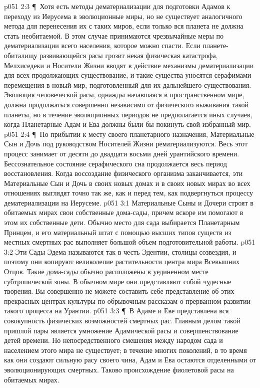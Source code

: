 \vs p051 2:3 \P\ Хотя есть методы дематериализации для подготовки Адамов к переходу из Иерусема в эволюционные миры, но не существует аналогичного метода для перенесения их с таких миров, если только вся планета не должна стать необитаемой. В этом случае принимаются чрезвычайные меры по дематериализации всего населения, которое можно спасти. Если планете\hyp{}обиталищу развивающейся расы грозит некая физическая катастрофа, Мелхиседеки и Носители Жизни вводят в действие механизмы дематериализации для всех продолжающих существование, и такие существа уносятся серафимами перемещения в новый мир, подготовленный для их дальнейшего существования. Эволюция человеческой расы, однажды начавшаяся в пространственном мире, должна продолжаться совершенно независимо от физического выживания такой планеты, но в течение эволюционных периодов не предполагается иных случаев, когда Планетарные Адам и Ева должны были бы покинуть свой избранный мир.
\vs p051 2:4 \P\ По прибытии к месту своего планетарного назначения, Материальные Сын и Дочь под руководством Носителей Жизни рематериализуются. Весь этот процесс занимает от десяти до двадцати восьми дней урантийского времени. Бессознательное состояние серафического сна продолжается весь период восстановления. Когда воссоздание физического организма заканчивается, эти Материальные Сын и Дочь в своих новых домах и в своих новых мирах во всех отношениях выглядят точно так же, как и перед тем, как подвергнуться процессу дематериализации на Иерусеме.
\vs p051 3:1 Материальные Сыны и Дочери строят в обитаемых мирах свои собственные дома\hyp{}сады, причем вскоре им помогают в этом их собственные дети. Обычно место для сада выбирается Планетарным Принцем, и его материальный штат с помощью высших типов существ из местных смертных рас выполняет большой объем подготовительной работы.
\vs p051 3:2 Эти Сады Эдема называются так в честь Эдентии, столицы созвездия, и поэтому они копируют великолепие растительности центра мира Всевышних Отцов. Такие дома\hyp{}сады обычно расположены в уединенном месте субтропической зоны. В обычном мире они представляют собой чудесные творения. Вы совершенно не можете составить себе представление об этих прекрасных центрах культуры по обрывочным рассказам о прерванном развитии такого процесса на Урантии.
\vs p051 3:3 \P\ В Адаме и Еве представлена вся совокупность физических возможностей смертных рас. Главным делом такой пришлой пары является умножение Адамической расы и совершенствование детей времени. Но непосредственного смешения между народом сада и населением этого мира не существует; в течение многих поколений, в то время как они создают сильную расу своего чина, Адам и Ева остаются отделенными от эволюционирующих смертных. Таково происхождение фиолетовой расы на обитаемых мирах.
